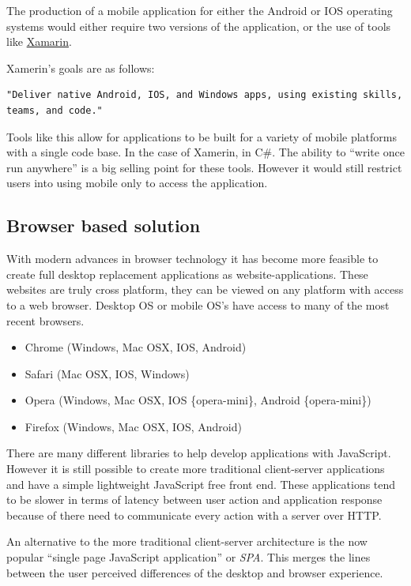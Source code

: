 The production of a mobile application for either the Android or IOS operating
systems would either require two versions of the application, or the use of
tools like \href{https://www.xamarin.com/platform}{Xamarin}.

Xamerin's goals are as follows:
\begin{verbatim}
"Deliver native Android, IOS, and Windows apps, using existing skills,
teams, and code."
\end{verbatim}\cite{Xamerin}

Tools like this allow for applications to be built for a variety of mobile
platforms with a single code base. In the case of Xamerin, in C\#. The ability
to ``write once run anywhere'' is a big selling point for these tools. However
it would still restrict users into using mobile only to access the application.

\subsection{Browser based solution}\label{browser-based-solution}

With modern advances in browser technology it has become more feasible to create
full desktop replacement applications as website-applications. These websites
are truly cross platform, they can be viewed on any platform with access to a
web browser. Desktop OS or mobile OS's have access to many of the most
recent browsers.

\begin{itemize}
  \item Chrome (Windows, Mac OSX, IOS, Android)
  \item Safari (Mac OSX, IOS, Windows)
  \item Opera (Windows, Mac OSX, IOS \{opera-mini\}, Android \{opera-mini\})
  \item Firefox (Windows, Mac OSX, IOS, Android)
\end{itemize}

There are many different libraries to help develop applications with JavaScript.
However it is still possible to create more traditional client-server
applications and have a simple lightweight JavaScript free front end. These
applications tend to be slower in terms of latency between user action and
application response because of there need to communicate every action with a
server over HTTP.

An alternative to the more traditional client-server architecture is the
now popular ``single page JavaScript application'' or \emph{SPA}. This merges the
lines between the user perceived differences of the desktop and browser
experience.

